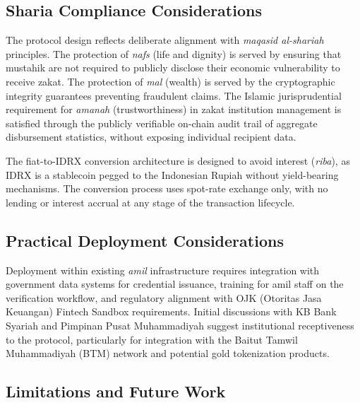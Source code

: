 \documentclass[conference]{IEEEtran}
\begin{document}
\subsection{Sharia Compliance Considerations}

The protocol design reflects deliberate alignment with \textit{maqasid al-shariah} principles. The protection of \textit{nafs} (life and dignity) is served by ensuring that mustahik are not required to publicly disclose their economic vulnerability to receive zakat. The protection of \textit{mal} (wealth) is served by the cryptographic integrity guarantees preventing fraudulent claims. The Islamic jurisprudential requirement for \textit{amanah} (trustworthiness) in zakat institution management is satisfied through the publicly verifiable on-chain audit trail of aggregate disbursement statistics, without exposing individual recipient data.

The fiat-to-IDRX conversion architecture is designed to avoid interest (\textit{riba}), as IDRX is a stablecoin pegged to the Indonesian Rupiah without yield-bearing mechanisms. The conversion process uses spot-rate exchange only, with no lending or interest accrual at any stage of the transaction lifecycle.

\subsection{Practical Deployment Considerations}

Deployment within existing \textit{amil} infrastructure requires integration with government data systems for credential issuance, training for amil staff on the verification workflow, and regulatory alignment with OJK (Otoritas Jasa Keuangan) Fintech Sandbox requirements. Initial discussions with KB Bank Syariah and Pimpinan Pusat Muhammadiyah suggest institutional receptiveness to the protocol, particularly for integration with the Baitut Tamwil Muhammadiyah (BTM) network and potential gold tokenization products.

\subsection{Limitations and Future Work}
\end{document}
